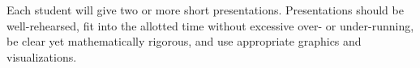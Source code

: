 Each student will give two or more  short presentations. Presentations should be well-rehearsed, fit into the allotted time without excessive over- or under-running, be clear yet mathematically rigorous, and use appropriate graphics and visualizations. 